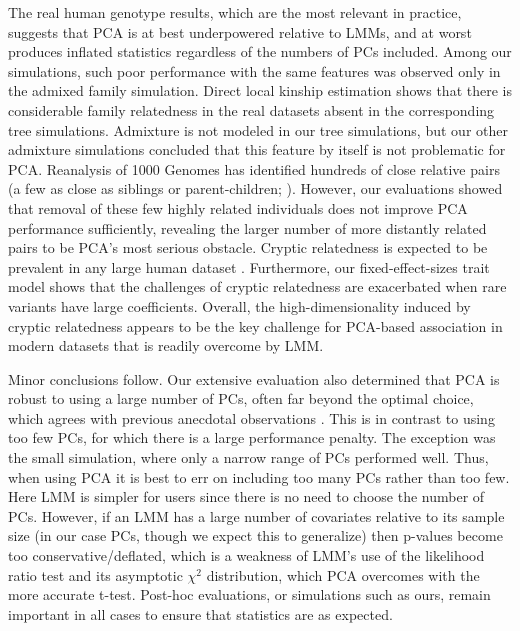 \documentclass[11pt]{article}
\begin{document}
The real human genotype results, which are the most relevant in practice, suggests that PCA is at best underpowered relative to LMMs, and at worst produces inflated statistics regardless of the numbers of PCs included.
Among our simulations, such poor performance with the same features was observed only in the admixed family simulation.
Direct local kinship estimation shows that there is considerable family relatedness in the real datasets absent in the corresponding tree simulations.
Admixture is not modeled in our tree simulations, but our other admixture simulations concluded that this feature by itself is not problematic for PCA.
Reanalysis of 1000 Genomes has identified hundreds of close relative pairs (a few as close as siblings or parent-children; \cite{gazal_high_2015, al-khudhair_inference_2015, fedorova_atlas_2016, schlauch_identification_2017}).
However, our evaluations showed that removal of these few highly related individuals does not improve PCA performance sufficiently, revealing the larger number of more distantly related pairs to be PCA's most serious obstacle.
Cryptic relatedness is expected to be prevalent in any large human dataset \citep{henn_cryptic_2012, shchur_number_2018}.
Furthermore, our fixed-effect-sizes trait model shows that the challenges of cryptic relatedness are exacerbated when rare variants have large coefficients.
Overall, the high-dimensionality induced by cryptic relatedness appears to be the key challenge for PCA-based association in modern datasets that is readily overcome by LMM.

Minor conclusions follow.
Our extensive evaluation also determined that PCA is robust to using a large number of PCs, often far beyond the optimal choice, which agrees with previous anecdotal observations \citep{price_principal_2006, kang_variance_2010}.
This is in contrast to using too few PCs, for which there is a large performance penalty.
The exception was the small simulation, where only a narrow range of PCs performed well.
Thus, when using PCA it is best to err on including too many PCs rather than too few.
Here LMM is simpler for users since there is no need to choose the number of PCs.
However, if an LMM has a large number of covariates relative to its sample size (in our case PCs, though we expect this to generalize) then p-values become too conservative/deflated, which is a weakness of LMM's use of the likelihood ratio test and its asymptotic $\chi^2$ distribution, which PCA overcomes with the more accurate t-test.
Post-hoc evaluations, or simulations such as ours, remain important in all cases to ensure that statistics are as expected.
\end{document}
